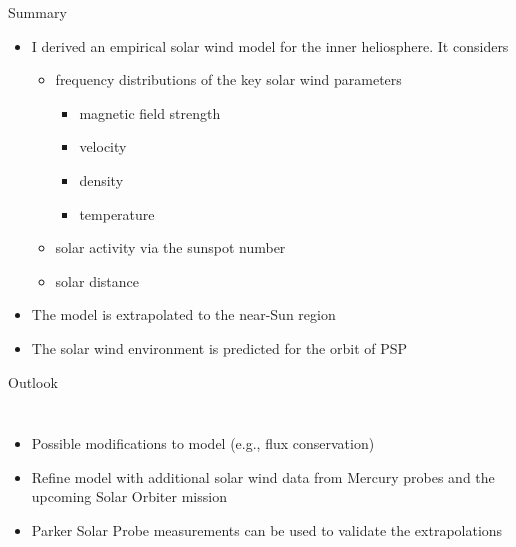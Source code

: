 \begin{frame}[c]{Summary}{}
	
	\begin{itemize}%
		\item I derived an empirical solar wind model for the inner heliosphere. It considers
		\begin{itemize}
			\item frequency distributions of the key solar wind parameters
			\begin{itemize}
				\item magnetic field strength
				\item velocity
				\item density
				\item temperature
			\end{itemize}
			\item solar activity via the sunspot number
			\item solar distance
		\end{itemize}
		\item The model is extrapolated to the near-Sun region
		\item The solar wind environment is predicted for the orbit of PSP
	\end{itemize}
	
\end{frame}

{
\begin{frame}[plain,t]{Outlook}{}
	\begin{columns}[c]
		
		\begin{itemize}
			\item Possible modifications to model (e.g., flux conservation)
			\item Refine model with additional solar wind data from Mercury probes and the upcoming Solar Orbiter mission
			\item Parker Solar Probe measurements can be used to validate the extrapolations
		\end{itemize}
		
		\vspace{2cm}
		
		
		
		
	\end{columns}
\end{frame}
}

